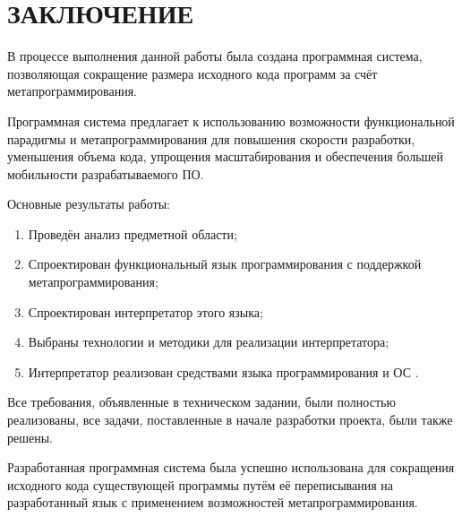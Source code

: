 \section*{ЗАКЛЮЧЕНИЕ}

В процессе выполнения данной работы была создана программная система, позволяющая сокращение размера исходного кода программ за счёт метапрограммирования.

Программная система предлагает к использованию возможности функциональной парадигмы и метапрограммирования для повышения скорости разработки, уменьшения объема кода, упрощения масштабирования и обеспечения большей мобильности разрабатываемого ПО.

Основные результаты работы:
\begin{enumerate}
	\item Проведён анализ предметной области;
	\item Спроектирован функциональный язык программирования с поддержкой метапрограммирования;
	\item Спроектирован интерпретатор этого языка;
	\item Выбраны технологии и методики для реализации интерпретатора;
	\item Интерпретатор реализован средствами языка программирования  и ОС .
\end{enumerate}


Все требования, объявленные в техническом задании, были полностью реализованы, все задачи, поставленные в начале разработки проекта, были также решены.

Разработанная программная система была успешно использована для сокращения исходного кода существующей программы путём её переписывания на разработанный язык с применением возможностей метапрограммирования.